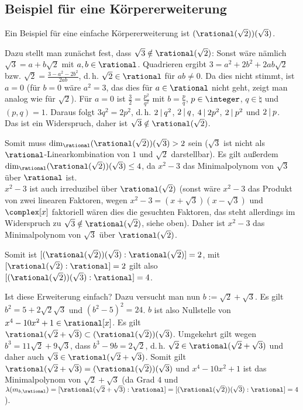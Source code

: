 \subsection{%
    Beispiel für eine Körpererweiterung%
}

\begin{Bsp}
    Ein Beispiel für eine einfache Körpererweiterung ist
    $(\rational(\sqrt{2}))(\sqrt{3})$.
    
    Dazu stellt man zunächst fest, dass $\sqrt{3} \notin \rational(\sqrt{2})$:
    Sonst wäre nämlich $\sqrt{3} = a + b\sqrt{2}$ mit $a, b \in \rational$.
    Quadrieren ergibt $3 = a^2 + 2b^2 + 2ab\sqrt{2}$ bzw.
    $\sqrt{2} = \frac{3 - a^2 - 2b^2}{2ab}$, d.\,h. $\sqrt{2} \in \rational$
    für $ab \not= 0$.
    Da dies nicht stimmt, ist $a = 0$
    (für $b = 0$ wäre $a^2 = 3$, das dies für $a \in \rational$ nicht geht,
    zeigt man analog wie für $\sqrt{2}$).
    Für $a = 0$ ist $\frac{3}{2} = \frac{p^2}{q^2}$ mit $b = \frac{p}{q}$,
    $p \in \integer$, $q \in \natural$ und $(p, q) = 1$.
    Daraus folgt $3q^2 = 2p^2$, d.\,h. $2 \mathbin{|} q^2$,
    $2 \mathbin{|} q$, $4 \mathbin{|} 2p^2$, $2 \mathbin{|} p^2$ und $2 \mathbin{|} p$.\\
    Das ist ein Widerspruch, daher ist $\sqrt{3} \notin \rational(\sqrt{2})$.
    
    Somit muss $\dim_\rational (\rational(\sqrt{2}))(\sqrt{3}) > 2$ sein
    ($\sqrt{3}$ ist nicht als $\rational$-Linearkombination von
    $1$ und $\sqrt{2}$ darstellbar).
    Es gilt außerdem $\dim_\rational (\rational(\sqrt{2}))(\sqrt{3}) \le 4$,
    da $x^2 - 3$ das Minimalpolynom von $\sqrt{3}$ über $\rational$ ist.\\
    $x^2 - 3$ ist auch irreduzibel über $\rational(\sqrt{2})$
    (sonst wäre $x^2 - 3$ das Produkt von zwei linearen Faktoren,
    wegen $x^2 - 3 = (x + \sqrt{3})(x - \sqrt{3})$ und $\complex[x]$
    faktoriell wären dies die gesuchten Faktoren, das steht allerdings im
    Widerspruch zu $\sqrt{3} \notin \rational(\sqrt{2})$, siehe oben).
    Daher ist $x^2 - 3$ das Minimalpolynom von
    $\sqrt{3}$ über $\rational(\sqrt{2})$.
    
    Somit ist $[(\rational(\sqrt{2}))(\sqrt{3}) : \rational(\sqrt{2})] = 2$,
    mit $[\rational(\sqrt{2}) : \rational] = 2$ gilt also
    $[(\rational(\sqrt{2}))(\sqrt{3}) : \rational] = 4$.
    
    Ist diese Erweiterung einfach?
    Dazu versucht man nun $b := \sqrt{2} + \sqrt{3}$.
    Es gilt $b^2 = 5 + 2\sqrt{2}\sqrt{3}$ und $(b^2 - 5)^2 = 24$.
    $b$ ist also Nullstelle von $x^4 - 10x^2 + 1 \in \rational[x]$.
    Es gilt $\rational(\sqrt{2} + \sqrt{3}) \subset
    (\rational(\sqrt{2}))(\sqrt{3})$.
    Umgekehrt gilt wegen $b^3 = 11\sqrt{2} + 9\sqrt{3}$, dass
    $b^3 - 9b = 2\sqrt{2}$, d.\,h.
    $\sqrt{2} \in \rational(\sqrt{2} + \sqrt{3})$ und daher auch
    $\sqrt{3} \in \rational(\sqrt{2} + \sqrt{3})$.
    Somit gilt $\rational(\sqrt{2} + \sqrt{3}) =
    (\rational(\sqrt{2}))(\sqrt{3})$ und
    $x^4 - 10x^2 + 1$ ist das Minimalpolynom von $\sqrt{2} + \sqrt{3}$
    (da Grad $4$ und\\
    $\lambda(m_{b,\rational}) =
    [\rational(\sqrt{2} + \sqrt{3}) : \rational] =
    [(\rational(\sqrt{2}))(\sqrt{3}) : \rational] = 4$).
\end{Bsp}


